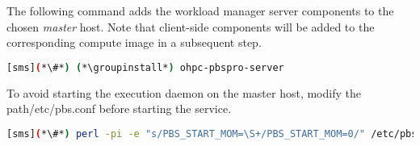 The following command adds the \rms{} workload manager server components to the
chosen {\em master} host. Note that client-side components will be added to
the corresponding compute image in a subsequent step.

\begin{lstlisting}[language=bash,keywords={}]
[sms](*\#*) (*\groupinstall*) ohpc-pbspro-server
\end{lstlisting}

To avoid starting the \rms{} execution daemon on the master host,
modify the path/etc/pbs.conf before starting the service.

\begin{lstlisting}[language=bash,keywords={}]
[sms](*\#*) perl -pi -e "s/PBS_START_MOM=\S+/PBS_START_MOM=0/" /etc/pbs.conf
\end{lstlisting}


